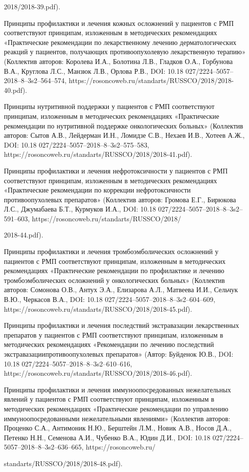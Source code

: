 2018/2018-39.pdf).

Принципы профилактики и лечения кожных осложнений у пациентов с РМП соответствуют принципам, изложенным в методических рекомендациях «Практические рекомендации по лекарственному лечению дерматологических реакций у пациентов, получающих противоопухолевую лекарственную терапию» (Коллектив авторов: Королева И.А., Болотина Л.В., Гладков О.А., Горбунова В.А., Круглова Л.С., Манзюк Л.В., Орлова Р.В., DOI: 10.18 027/2224–5057–2018–8–3s2–564–574, https://rosoncoweb.ru/standarts/RUSSCO/2018/2018-40.pdf).

Принципы нутритивной поддержки у пациентов с РМП соответствуют принципам, изложенным в методических рекомендациях «Практические рекомендации по нутритивной поддержке онкологических больных» (Коллектив авторов: Сытов А.В., Лейдерман И.Н., Ломидзе С.В., Нехаев И.В., Хотеев А.Ж., DOI: 10.18 027/2224–5057–2018–8–3s2–575–583, https://rosoncoweb.ru/standarts/RUSSCO/2018/2018-41.pdf).

Принципы профилактики и лечения нефротоксичности у пациентов с РМП соответствуют принципам, изложенным в методических рекомендациях «Практические рекомендации по коррекции нефротоксичности противоопухолевых препаратов» (Коллектив авторов: Громова Е.Г., Бирюкова Л.С., Джумабаева Б.Т., Курмуков И.А., DOI: 10.18 027/2224–5057–2018–8–3s2–591–603, https://rosoncoweb.ru/standarts/RUSSCO/2018/

2018-44.pdf).

Принципы профилактики и лечения тромбоэмболических осложнений у пациентов с РМП соответствуют принципам, изложенным в методических рекомендациях «Практические рекомендации по профилактике и лечению тромбоэмболических осложнений у онкологических больных» (Коллектив авторов: Сомонова О.В., Антух Э.А., Елизарова А.Л., Матвеева И.И., Сельчук В.Ю., Черкасов В.А., DOI: 10.18 027/2224–5057–2018–8–3s2–604–609, https://rosoncoweb.ru/standarts/RUSSCO/2018/2018-45.pdf).

Принципы профилактики и лечения последствий экстравазации лекарственных препаратов у пациентов с РМП соответствуют принципам, изложенным в методических рекомендациях «Рекомендации по лечению последствий экстравазациипротивоопухолевых препаратов» (Автор: Буйденок Ю.В., DOI: 10.18 027/2224–5057–2018–8–3s2–610–616, https://rosoncoweb.ru/standarts/RUSSCO/2018/2018-46.pdf).

Принципы профилактики и лечения иммуноопосредованных нежелательных явлений у пациентов с РМП соответствуют принципам, изложенным в методических рекомендациях «Практические рекомендации по управлению иммуноопосредованными нежелательными явлениями» (Коллектив авторов: Проценко С.А., Антимоник Н.Ю., Берштейн Л.М., Новик А.В., Носов Д.А., Петенко Н.Н., Семенова А.И., Чубенко В.А., Юдин Д.И., DOI: 10.18 027/2224–5057–2018–8–3s2–636–665, https://rosoncoweb.ru/

standarts/RUSSCO/2018/2018-48.pdf).
